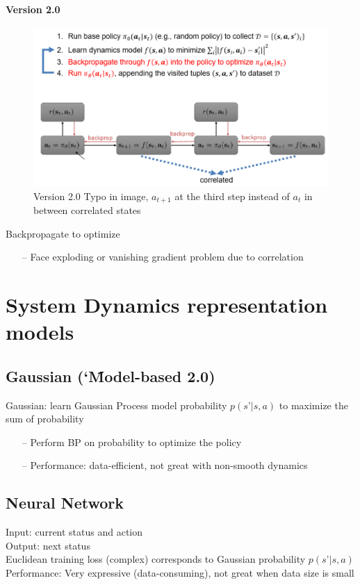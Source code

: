 \documentclass{article}
\begin{document}
\noindent\textbf{Version 2.0}

\begin{figure}[h]
    \centering
        \includegraphics[width=0.8\linewidth]{img/v2.png}
    \caption{Version 2.0   Typo in image, $a_{t+1}$ at the third step instead of $a_{t}$ in between correlated states}
    \label{fig:v2}
\end{figure}

Backpropagate to optimize
\begin{itemize}
\item[--] Face exploding or vanishing gradient problem due to correlation
\end{itemize}

\section{System Dynamics representation models}
\subsection{Gaussian (\char`\~ Model-based 2.0)}
Gaussian: learn Gaussian Process model probability $p(s’|s,a)$ to maximize the sum of probability
\begin{itemize}
\item[--] Perform BP on probability to optimize the policy
\item[--] Performance: data-efficient, not great with non-smooth dynamics
\end{itemize}

\subsection{Neural Network}
Input: current status and action\\
Output: next status\\
Euclidean training loss (complex) corresponds to Gaussian probability $p(s’|s,a)$\\
Performance: Very expressive (data-consuming), not great when data size is small
\end{document}
